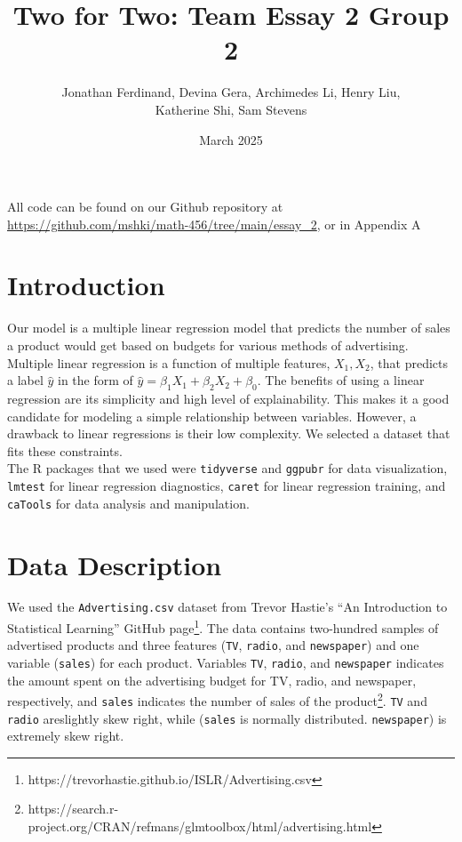 \documentclass{article}
\title{Two for Two: Team Essay 2 Group 2}
\author{Jonathan Ferdinand, Devina Gera, Archimedes Li, Henry Liu, \\Katherine Shi, Sam Stevens}
\date{March 2025}
\begin{document}
\maketitle

All code can be found on our Github repository at \url{https://github.com/mshki/math-456/tree/main/essay_2}, or in Appendix A

\section{Introduction}

Our model is a multiple linear regression model that predicts the number of sales a product would get based on budgets for various methods of advertising.  Multiple linear regression is a function of multiple features, $X_1, X_2$, that predicts a label $\hat{y}$ in the form of $\hat{y} = \beta_1X_1 +\beta_2X_2 + \beta_0$.  The benefits of using a linear regression are its simplicity and high level of explainability.  This makes it a good candidate for modeling a simple relationship between variables.  However, a drawback to linear regressions is their low complexity.  We selected a dataset that fits these constraints. \\

\noindent The R packages that we used were \texttt{tidyverse} and \texttt{ggpubr} for data visualization, \texttt{lmtest} for linear regression diagnostics, \texttt{caret} for linear regression training, and \texttt{caTools} for data analysis and manipulation.

\section{Data Description}
We used the \texttt{Advertising.csv} dataset from Trevor Hastie’s “An Introduction to Statistical Learning”  GitHub page\footnote{https://trevorhastie.github.io/ISLR/Advertising.csv}. The data contains two-hundred samples of advertised products and three features (\texttt{TV}, \texttt{radio}, and \texttt{newspaper}) and one variable (\texttt{sales}) for each product. Variables \texttt{TV}, \texttt{radio}, and \texttt{newspaper} indicates the amount spent on the advertising budget for TV, radio, and newspaper, respectively, and \texttt{sales} indicates the number of sales of the product\footnote{https://search.r-project.org/CRAN/refmans/glmtoolbox/html/advertising.html}. \texttt{TV} and \texttt{radio} areslightly skew right, while (\texttt{sales} is normally distributed.   \texttt{newspaper}) is extremely skew right.
\end{document}

